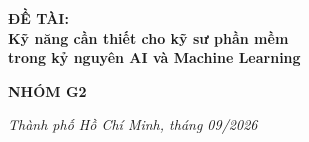 \begin{titlepage}
\vspace{1.5cm}

\begin{center}
    {\Large \textbf{ĐỀ TÀI:}}\\[0.3cm]
    {\Large \textbf{Kỹ năng cần thiết cho kỹ sư phần mềm}}\\[0.2cm]
    {\Large \textbf{trong kỷ nguyên AI và Machine Learning}}
\end{center}

\vspace{2cm}

\begin{center}
    {\large \textbf{NHÓM G2}}
\end{center}

\vfill

\centerline{\large \textit{Thành phố Hồ Chí Minh, tháng 09/2026}}
\vspace*{0.8cm} 

\end{titlepage}
